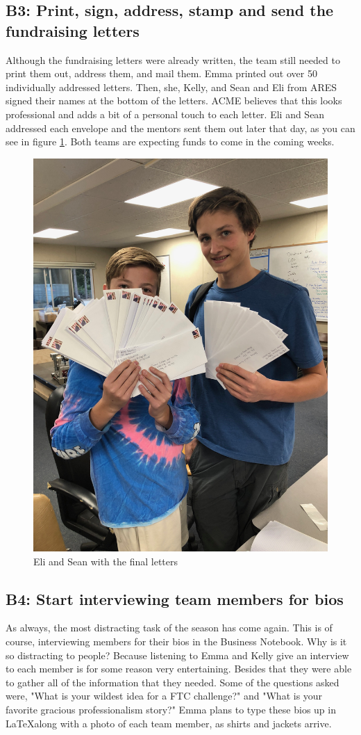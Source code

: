 \documentclass{article}
\begin{document}
\subsection{B3: Print, sign, address, stamp and send the fundraising letters}

Although the fundraising letters were already written, the team still needed to print them out, address them, and mail them. Emma printed out over 50 individually addressed letters. Then, she, Kelly, and Sean and Eli from ARES signed their names at the bottom of the letters. ACME believes that this looks professional and adds a bit of a personal touch to each letter.  Eli and Sean addressed each envelope and the mentors sent them out later that day, as you can see in figure \ref{fig:Letters}. Both teams are expecting funds to come in the coming weeks. 

\begin{figure}
    \centering
    \includegraphics[width=.6 \textwidth]{07_10-15/images/letters.jpg}
    \caption{Eli and Sean with the final letters}
    \label{fig:Letters}
\end{figure}

\subsection{B4: Start interviewing team members for bios}

As always, the most distracting task of the season has come again. This is of course, interviewing members for their bios in the Business Notebook. Why is it so distracting to people? Because listening to Emma and Kelly give an interview to each member is for some reason very entertaining. Besides that they were able to gather all of the information that they needed. Some of the questions asked were, "What is your wildest idea for a FTC challenge?" and "What is your favorite gracious professionalism story?" Emma plans to type these bios up in \LaTeX along with a photo of each team member, as shirts and jackets arrive. 
\end{document}
